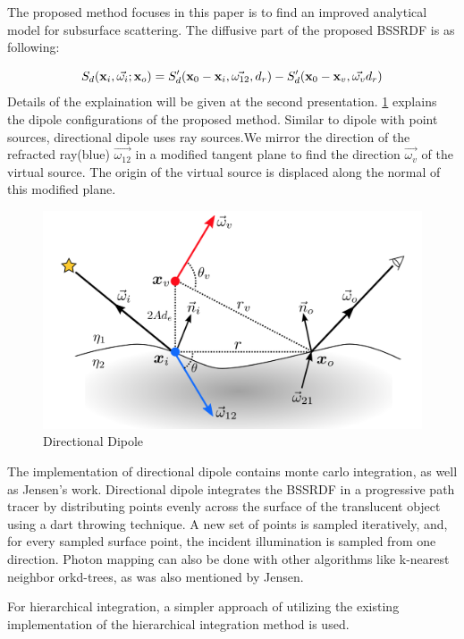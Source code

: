 \documentclass[12pt]{article}
\begin{document}
The proposed method  focuses in this paper is to find an improved
analytical model for subsurface scattering. The diffusive part of the
proposed BSSRDF is as following:


$$
S_d({\bf x}_i, \vec{\omega_i}; {\bf x}_o)  = S'_d({\bf x}_0 - {\bf x}_i,
\vec{\omega_{12}}, d_r) - S'_d({\bf x}_0 - {\bf x}_v, \vec{\omega_v}
d_r)
$$
Details of the explaination will be given at the second
presentation. \ref{fig:directional} explains the dipole configurations of
the proposed method. Similar to dipole with point sources, directional
dipole uses ray sources.We mirror the direction of the refracted
ray(blue) $\vec{\omega_{12}}$ in a modified tangent
plane to find the direction $\vec{\omega_v}$ of the virtual source.
The origin of the virtual source is displaced along the normal of this modified plane.

\begin{figure}[!ht]
  \centering
  \includegraphics[scale=0.2]{direct.png}
  \caption{Directional Dipole}
  \label{fig:directional}
\end{figure}

The implementation of directional dipole contains monte carlo
integration, as well as Jensen's work. Directional dipole  integrates
the BSSRDF in a progressive path tracer by distributing points evenly
across the surface of the translucent object using a dart throwing
technique. A new set of points is sampled iteratively, and, for every
sampled surface point, the incident illumination is sampled from one
direction. Photon mapping can also be done with other algorithms
like k-nearest neighbor orkd-trees, as was also mentioned by Jensen.

For hierarchical integration,
  a simpler approach of utilizing the existing
implementation of the hierarchical integration method is used.


{}


\end{document}
